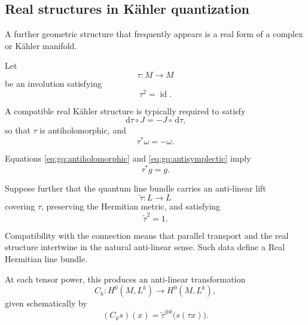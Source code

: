 \documentclass[a4paper,11pt]{article}
\theoremstyle{definition}
\newcommand{\dd}{\,\mathrm{d}}
\begin{document}
\subsection{Real structures in K\"ahler quantization}
\label{app:gq:realstructures}

A further geometric structure that frequently appears is a real form of a
complex or K\"ahler manifold.

Let
\begin{equation}
    \tau:M\rightarrow M
\end{equation}
be an involution satisfying
\begin{equation}
    \tau^2=\operatorname{id}.
\end{equation}

A compatible real K\"ahler structure is typically required to satisfy
\begin{equation}
    \dd\tau\circ J
    =
    -J\circ\dd\tau,
    \label{eq:gq:antiholomorphic}
\end{equation}
so that $\tau$ is antiholomorphic, and
\begin{equation}
    \tau^*\omega=-\omega.
    \label{eq:gq:antisymplectic}
\end{equation}

Equations
\eqref{eq:gq:antiholomorphic} and
\eqref{eq:gq:antisymplectic} imply
\begin{equation}
    \tau^*g=g.
\end{equation}

Suppose further that the quantum line bundle carries an anti-linear lift
\begin{equation}
    \widetilde\tau:L\rightarrow L
\end{equation}
covering $\tau$, preserving the Hermitian metric, and satisfying
\begin{equation}
    \widetilde\tau^2=1.
\end{equation}

Compatibility with the connection means that parallel transport and the real
structure intertwine in the natural anti-linear sense.  Such data define a
Real Hermitian line bundle.

At each tensor power, this produces an anti-linear transformation
\begin{equation}
    C_k:
    H^0(M,L^k)
    \rightarrow
    H^0(M,L^k),
\end{equation}
given schematically by
\begin{equation}
    (C_ks)(x)
    =
    \widetilde\tau^{\otimes k}
    \big(
       s(\tau x)
    \big).
\end{equation}
\end{document}
